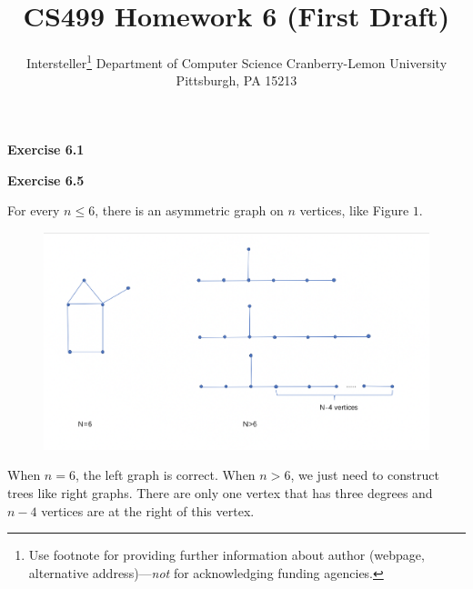 \documentclass{article} %
\title{CS499 Homework 6 (First Draft)}
\author{
	Intersteller\thanks{ Use footnote for providing further information
		about author (webpage, alternative address)---\emph{not} for acknowledging
		funding agencies.}
	Department of Computer Science
	Cranberry-Lemon University
	Pittsburgh, PA 15213
}
\begin{document}
	\maketitle
	\textbf{Exercise 6.1}\par
	
	\textbf{Exercise 6.5}\par
	For every $n\le6$, there is an asymmetric graph on $n$ vertices, like Figure $1$.
  	\begin{figure}[H]
  	\centering
  	\includegraphics[scale=0.4]{6.5.png}
  	\caption{}
  	\label{fig:1}
  	\end{figure}
	When $n=6$, the left graph is correct. When $n>6$, we just need to construct trees like right graphs. 
	There are only one vertex that has three degrees and  $n-4$ vertices are at the right of this vertex.
	 
\end{document}

